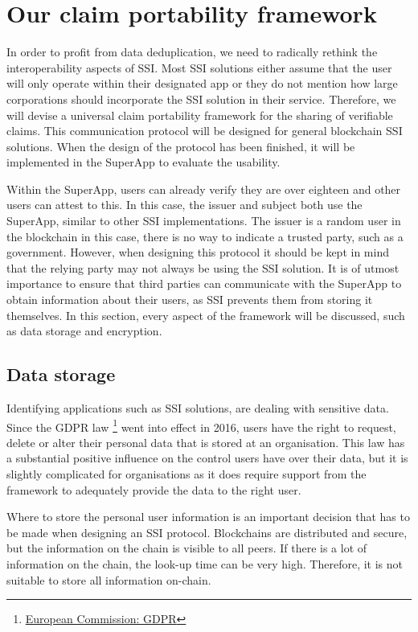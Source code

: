 \section{Our claim portability framework}
In order to profit from data deduplication, we need to radically rethink the interoperability aspects of SSI. Most SSI solutions either assume that the user will only operate within their designated app or they do not mention how large corporations should incorporate the SSI solution in their service. Therefore, we will devise a universal claim portability framework for the sharing of verifiable claims. This communication protocol will be designed for general blockchain SSI solutions. When the design of the protocol has been finished, it will be implemented in the SuperApp to evaluate the usability. 

Within the SuperApp, users can already verify they are over eighteen and other users can attest to this. In this case, the issuer and subject both use the SuperApp, similar to other SSI implementations. The issuer is a random user in the blockchain in this case, there is no way to indicate a trusted party, such as a government. However, when designing this protocol it should be kept in mind that the relying party may not always be using the SSI solution. It is of utmost importance to ensure that third parties can communicate with the SuperApp to obtain information about their users, as SSI prevents them from storing it themselves. In this section, every aspect of the framework will be discussed, such as data storage and encryption.

\subsection{Data storage}
Identifying applications such as SSI solutions, are dealing with sensitive data. Since the GDPR law \footnote{\href{https://ec.europa.eu/info/law/law-topic/data-protection/reform/rights-citizens/my-rights/what-are-my-rights_nl}{European Commission: GDPR}} went into effect in 2016, users have the right to request, delete or alter their personal data that is stored at an organisation. This law has a substantial positive influence on the control users have over their data, but it is slightly complicated for organisations as it does require support from the framework to adequately provide the data to the right user. 

Where to store the personal user information is an important decision that has to be made when designing an SSI protocol. Blockchains are distributed and secure, but the information on the chain is visible to all peers. If there is a lot of information on the chain, the look-up time can be very high. Therefore, it is not suitable to store all information on-chain.  


